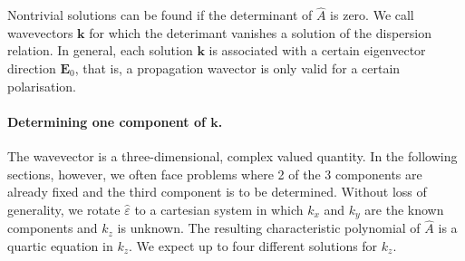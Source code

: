 \documentclass[12pt,a4paper,twoside,openright,BCOR10mm,headsepline,titlepage,abstracton,chapterprefix,final]{scrreprt}
\newcommand\Vector[1]{{\mathbf{#1}}}
\newcommand\wavenumber{k}
\newcommand\Wavevector{\Vector{\wavenumber}}
\newcommand\Tensor[1]{\hat{#1}}
\newcommand\scalarEfield{E}
\newcommand\Efield{\Vector{\scalarEfield}}
\newcommand\permittivity{\Tensor{\scalarpermittivity}}
\newcommand\scalarpermittivity{\varepsilon}
\begin{document}
Nontrivial solutions can be found if the determinant of $\hat{A}$ is zero.
We call wavevectors $\Wavevector$ for which the deterimant vanishes a solution of the dispersion relation.
In general, each solution $\Wavevector$ is associated with a certain eigenvector direction $\Efield_0$,
that is, a propagation wavector is only valid for a certain polarisation.

\paragraph{Determining one component of $\Wavevector$.}

The wavevector is a three-dimensional, complex valued quantity.
In the following sections, however, 
we often face problems where 2 of the 3 components are already fixed and the third component is to be determined.
Without loss of generality, we rotate $\permittivity$ 
to a cartesian system in which $\wavenumber_x$ and $\wavenumber_y$ are the known components and $\wavenumber_z$ is unknown.
The resulting characteristic polynomial of $\hat{A}$ is a quartic equation in $\wavenumber_z$.
We expect up to four different solutions for $\wavenumber_z$.
\end{document}
